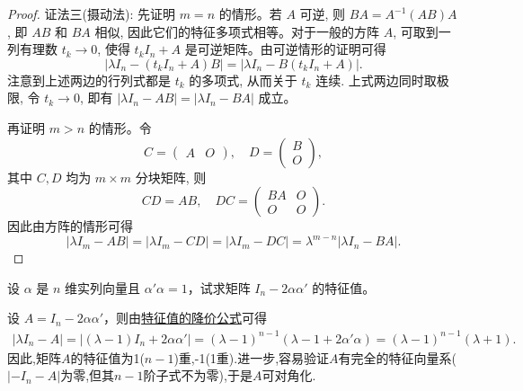 \documentclass[../../main.tex]{subfiles}%
\begin{document}
\begin{proof}
{\color{blue}证法三(摄动法):} 先证明 \(m = n\) 的情形。若 \(A\) 可逆, 则 \(BA = A^{-1}(AB)A\), 即 \(AB\) 和 \(BA\) 相似, 因此它们的特征多项式相等。对于一般的方阵 \(A\), 可取到一列有理数 \(t_k \to 0\), 使得 \(t_k I_n + A\) 是可逆矩阵。由可逆情形的证明可得
\[
|\lambda I_n - (t_k I_n + A)B| = |\lambda I_n - B(t_k I_n + A)|.
\]
注意到上述两边的行列式都是 \( t_k \) 的多项式, 从而关于 \( t_k \) 连续. 上式两边同时取极限, 令 \( t_k \to 0 \), 即有
\(
|\lambda I_n - AB| = |\lambda I_n - BA|
\)
成立。

再证明 \( m > n \) 的情形。令
\[
C = \begin{pmatrix}
A & O
\end{pmatrix}, \quad D = \begin{pmatrix}
B \\
O
\end{pmatrix},
\]
其中 \( C, D \) 均为 \( m \times m \) 分块矩阵, 则
\[
CD = AB, \quad DC = \begin{pmatrix}
BA & O \\
O & O
\end{pmatrix}.
\]
因此由方阵的情形可得
\[
|\lambda I_m - AB| = |\lambda I_m - CD| = |\lambda I_m - DC| = \lambda^{m-n} |\lambda I_n - BA|.
\]

\end{proof}

\begin{example}
设 $\alpha$ 是 $n$ 维实列向量且 $\alpha' \alpha = 1$，试求矩阵 $I_n - 2 \alpha \alpha'$ 的特征值。
\end{example}
\begin{solution}

设 $A = I_n - 2 \alpha \alpha'$，则由\hyperref[theorem:特征值的降价公式]{特征值的降价公式}可得
\begin{align*}
| \lambda I_n - A | 
= | (\lambda - 1) I_n + 2 \alpha \alpha' | 
= (\lambda - 1)^{n-1} (\lambda - 1 + 2 \alpha' \alpha) 
= (\lambda - 1)^{n-1} (\lambda + 1).
\end{align*}
因此,矩阵$A$的特征值为1($n-1$)重,-1(1重).进一步,容易验证$A$有完全的特征向量系($| -I_n - A | $为零,但其$n-1$阶子式不为零),于是$A$可对角化.

\end{solution}
\end{document}
